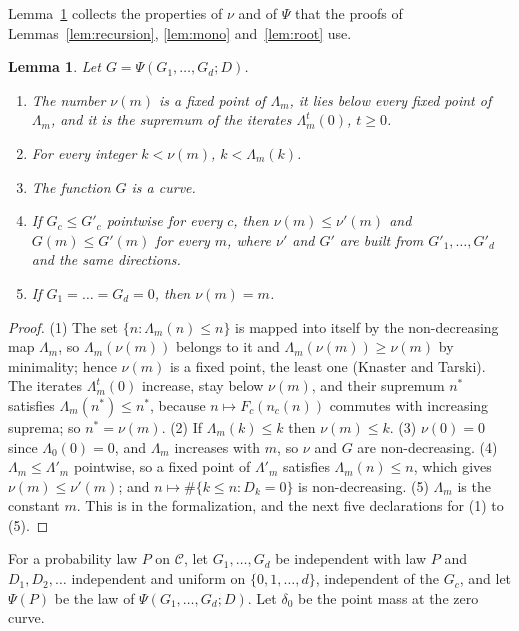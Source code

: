 \documentclass[11pt]{amsart}
\newtheorem{lemma}[theorem]{Lemma}
\theoremstyle{definition}
\numberwithin{equation}{section}
\newcommand{\lean}[1]{\ignorespaces}
\newcommand{\cC}{\mathcal{C}}
\begin{document}
Lemma~\ref{lem:psi} collects the properties of $\nu$ and of $\Psi$ that the proofs of Lemmas~\ref{lem:recursion}, \ref{lem:mono} and~\ref{lem:root} use.

\begin{lemma}\label{lem:psi}\lean{FrogModel.LemmaX.psiLeastFixed_holds, FrogModel.LemmaX.psiIterate_holds, FrogModel.LemmaX.psiStep_holds, FrogModel.LemmaX.psiCurve_holds, FrogModel.LemmaX.psiMono_holds, FrogModel.LemmaX.psiZero_holds}
Let $G=\Psi(G_1,\dots,G_d;D)$.
\begin{enumerate}
\item The number $\nu(m)$ is a fixed point of $\Lambda_m$, it lies below every fixed point of $\Lambda_m$, and it is the supremum of the iterates $\Lambda_m^t(0)$, $t\ge0$.
\item For every integer $k<\nu(m)$, $k<\Lambda_m(k)$.
\item The function $G$ is a curve.
\item If $G_c\le G'_c$ pointwise for every $c$, then $\nu(m)\le\nu'(m)$ and $G(m)\le G'(m)$ for every $m$, where $\nu'$ and $G'$ are built from $G'_1,\dots,G'_d$ and the same directions.
\item If $G_1=\dots=G_d=0$, then $\nu(m)=m$.
\end{enumerate}
\end{lemma}

\begin{proof}
(1) The set $\{n:\Lambda_m(n)\le n\}$ is mapped into itself by the non-decreasing map $\Lambda_m$, so $\Lambda_m(\nu(m))$ belongs to it and $\Lambda_m(\nu(m))\ge\nu(m)$ by minimality; hence $\nu(m)$ is a fixed point, the least one (Knaster and Tarski). The iterates $\Lambda_m^t(0)$ increase, stay below $\nu(m)$, and their supremum $n^*$ satisfies $\Lambda_m(n^*)\le n^*$, because $n\mapsto F_c(n_c(n))$ commutes with increasing suprema; so $n^*=\nu(m)$. (2) If $\Lambda_m(k)\le k$ then $\nu(m)\le k$. (3) $\nu(0)=0$ since $\Lambda_0(0)=0$, and $\Lambda_m$ increases with $m$, so $\nu$ and $G$ are non-decreasing. (4) $\Lambda_m\le\Lambda'_m$ pointwise, so a fixed point of $\Lambda'_m$ satisfies $\Lambda_m(n)\le n$, which gives $\nu(m)\le\nu'(m)$; and $n\mapsto\#\{k\le n:D_k=0\}$ is non-decreasing. (5) $\Lambda_m$ is the constant $m$. This is  in the formalization, and the next five declarations for (1) to (5).
\end{proof}

For a probability law $P$ on $\cC$, let $G_1,\dots,G_d$ be independent with law $P$ and $D_1,D_2,\dots$ independent and uniform on $\{0,1,\dots,d\}$, independent of the $G_c$, and let $\Psi(P)$ be the law of $\Psi(G_1,\dots,G_d;D)$. Let $\delta_0$ be the point mass at the zero curve.
\end{document}
